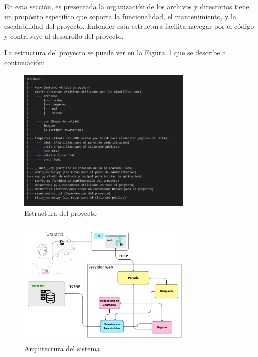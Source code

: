 \documentclass[a4paper, 12pt]{book}
\begin{document}
En esta sección, es presentada la organización de los archivos y directorios tiene un propósito específico que soporta la funcionalidad, el mantenimiento, y la 
escalabilidad del proyecto. Entender esta estructura facilita navegar por el código y contribuye al desarrollo del proyecto.

La estructura del proyecto se puede ver en la Figura~\ref{fig:estructura} que se describe a continuación:

\begin{figure}
  \centering
  \includegraphics[width=0.75\textwidth]{img/estructura.png}
  \caption{Estructura del proyecto}
  \label{fig:estructura}
\end{figure}
\begin{figure}
  \centering
  \includegraphics[width=0.75\textwidth]{img/esquema2.png}
  \caption{Arquitectura del sistema}
  \label{fig:arq}
\end{figure}
\end{document}
